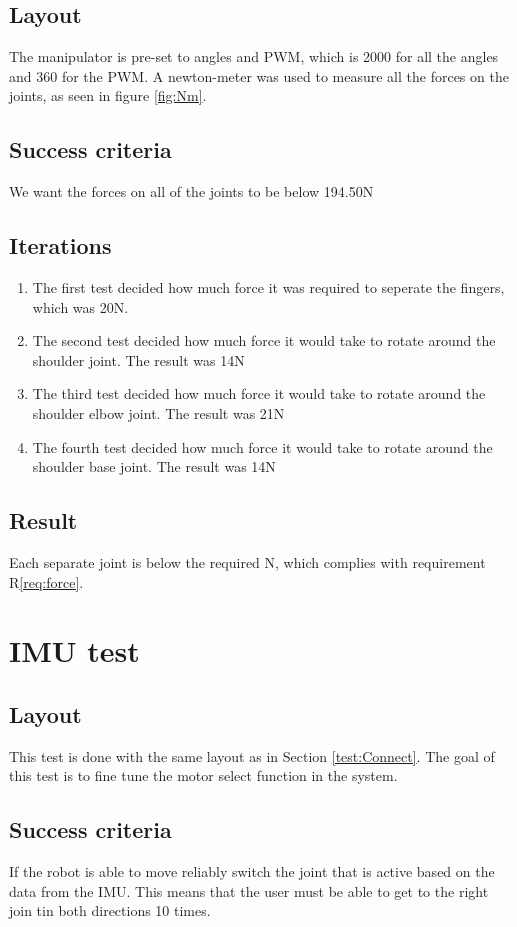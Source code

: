 \subsection*{Layout}
The manipulator is pre-set to angles and PWM, which is 2000 for all the angles and 360 for the PWM. A newton-meter was used to measure all the forces on the joints, as seen in figure \ref{fig:Nm}.\\

\subsection*{Success criteria}
We want the forces on all of the joints to be below 194.50N
\subsection*{Iterations}
\begin{enumerate}
    \item The first test decided how much force it was required to seperate the fingers, which was 20N.
    \item The second test decided how much force it would take to rotate around the shoulder joint.
    The result was 14N
    \item The third test decided how much force it would take to rotate around the shoulder elbow joint. The result was 21N
    \item The fourth test decided how much force it would take to rotate around the shoulder base joint. The result was 14N
    \end{enumerate}
\subsection*{Result}
Each separate joint is below the required N, which complies with requirement R\ref{req:force}.
\newpage
\section{IMU test}
\subsection*{Layout}
This test is done with the same layout as in Section \ref{test:Connect}. The goal of this test is to fine tune the motor select function in the system. 
\subsection*{Success criteria}
 If the robot is able to  move reliably switch the joint that is active based on the data from the IMU. This means that the user must be able to get to the right join tin both directions 10 times.
